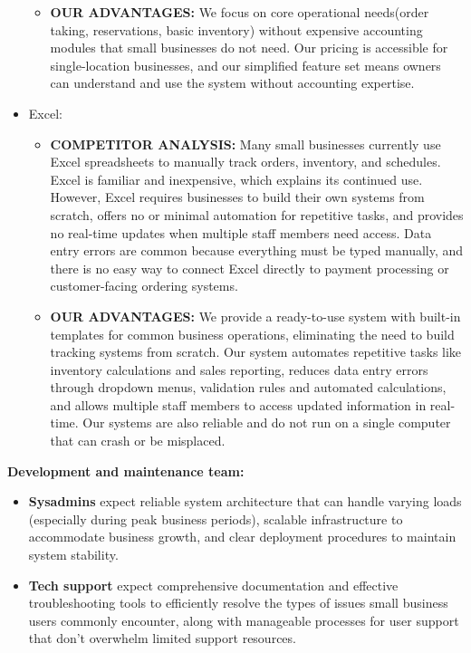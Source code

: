 \documentclass[]{VUMIFTemplateClass}
\begin{document}
\begin{itemize}
\begin{itemize}
        \item \textbf{OUR ADVANTAGES:} 
        We focus on core operational needs(order taking,
        reservations, basic inventory) without expensive accounting modules that
        small businesses do not need. Our pricing is accessible for single-location
        businesses, and our simplified feature set means owners can understand and
        use the system without accounting expertise.
    \end{itemize}
    

    \item Excel: 
    
    \begin{itemize}
        \item \textbf{COMPETITOR ANALYSIS:}
        Many small businesses currently use Excel spreadsheets
        to manually track orders, inventory, and schedules. Excel is familiar and
        inexpensive, which explains its continued use. However, Excel requires
        businesses to build their own systems from scratch, offers no or minimal automation for
        repetitive tasks, and provides no real-time updates when multiple staff
        members need access. Data entry errors are common because everything must be
        typed manually, and there is no easy way to connect Excel directly to payment
        processing or customer-facing ordering systems.
        
        \item \textbf{OUR ADVANTAGES:} 
        We provide a ready-to-use system with built-in
        templates for common business operations, eliminating the need to build
        tracking systems from scratch. Our system automates repetitive tasks like
        inventory calculations and sales reporting, reduces data entry errors
        through dropdown menus, validation rules and automated calculations, and allows multiple staff
        members to access updated information in real-time. Our systems are also reliable and do not run on a single
        computer that can crash or be misplaced.
        \end{itemize}
        
\end{itemize}

\textbf{Development and maintenance team:}
\begin{itemize}
    \item \textbf{Sysadmins} expect reliable system architecture that can handle
    varying loads (especially during peak business periods), scalable
    infrastructure to accommodate business growth, and clear deployment
    procedures to maintain system stability.
    \item \textbf{Tech support} expect comprehensive documentation and effective
    troubleshooting tools to efficiently resolve the types of issues small
    business users commonly encounter, along with manageable processes for user
    support that don't overwhelm limited support resources.
\end{itemize}
\end{document}
